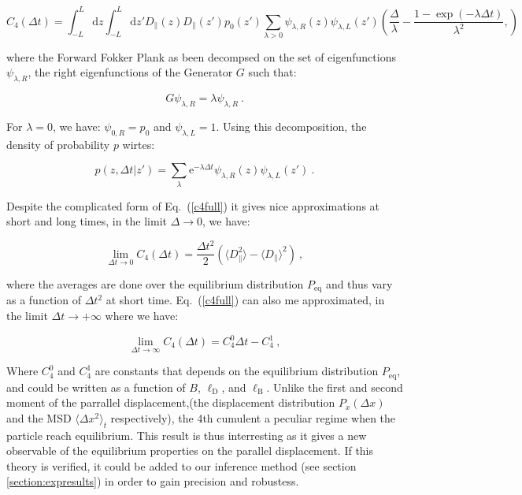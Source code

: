 \begin{equation}
	C_4(\Delta t) = \int_{-L} ^L \mathrm{d}z 
	\int ^L _{-L}\mathrm{d}z'
	D_\parallel(z) D_\parallel(z') p_0(z') 
	\sum_{\lambda > 0} \psi_{\lambda, R} (z) \psi_{\lambda, L}(z')
	\left(
	\frac{\Delta}{\lambda} - \frac{1 - \exp(-\lambda \Delta t)}{\lambda ^2},
	\right) 
	\label{c4full}
\end{equation}

where the Forward Fokker Plank as been decompsed on the set of eigenfunctions $\psi_{\lambda, R}$, the right eigenfunctions of the Generator $G$ such that:

\begin{equation}
	G\psi_{\lambda, R} = \lambda \psi_{\lambda, R} ~.
\end{equation}

For $\lambda = 0$, we have: $\psi_{0, R} = p_0$ and $\psi_{\lambda, L} = 1$. Using this decomposition, the density of probability $p$ wirtes:

\begin{equation}
	p(z, \Delta t|z') = \sum _\lambda \mathrm{e} ^{-\lambda \Delta t} \psi_{\lambda, R} (z) \psi_{\lambda, L} (z') ~.
\end{equation}

Despite the complicated form of Eq.~(\ref{c4full}) it gives nice approximations at short and long times, in the limit $\Delta \rightarrow 0$, we have:

\begin{equation}
	\lim\limits_{\Delta t \rightarrow 0 } C_4 (\Delta t) = \frac{\Delta t ^2}{2}
	\left(
	\langle D_\parallel ^2 \rangle - \langle D _\parallel \rangle ^2 
	\right)~,
\end{equation}

where the averages are done over the equilibrium distribution $P_\mathrm{eq}$ and thus vary as a function of $\Delta t ^2$ at short time. Eq.~(\ref{c4full}) can also me approximated, in the limit $\Delta t \rightarrow + \infty$ where we have:

\begin{equation}
	\lim\limits_{\Delta t \rightarrow \infty } C_4 (\Delta t) = C_4 ^0 \Delta t - C^1 _4 ~,
\end{equation}

Where $ C_4 ^0$ and $ C_4 ^1$ are constants that depends on the equilibrium distribution $P_\mathrm{eq}$, and could be written as a function of $B$, $\ell _ \mathrm{D}$, and $\ell _\mathrm{B}$. Unlike the first and second moment of the parrallel displacement,(the displacement distribution $P_x(\Delta x)$ and the \gls{MSD} $\langle \Delta x ^2 \rangle_t $ respectively), the 4th cumulent a peculiar regime when the particle reach equilibrium. This result is thus interresting as it gives a new observable of the equilibrium properties on the parallel displacement. If this theory is verified, it could be added to our inference method (see section \ref{section:expresults}) in order to gain precision and robustess.

